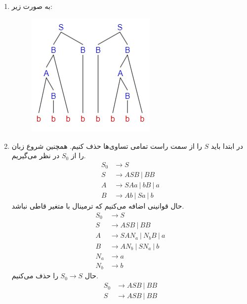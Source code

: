 \subsection{}
\begin{enumerate}
    \item به صورت زیر:
    \begin{figure}[H]
        \centering
        \includegraphics[scale=0.5]{pics/1-3-1.png}
    \end{figure}
    \item در ابتدا باید $S$ را از سمت راست تمامی تساوی‌ها حذف کنیم. همچنین شروع
    زبان را از
    $S_0$
    در نظر می‌گیریم.
    \begin{align*}
        S_0 &\rightarrow S\\
        S &\rightarrow ASB ~|~ BB\\
        A &\rightarrow SAa ~|~ bB ~|~ a\\
        B &\rightarrow Ab ~|~ Sa ~|~ b
    \end{align*}
    حال قوانینی اضافه می‌‌کنیم که ترمینال با متغیر قاطی نباشد.
    \begin{align*}
        S_0 &\rightarrow S\\
        S &\rightarrow ASB ~|~ BB\\
        A &\rightarrow SAN_a ~|~ N_bB ~|~ a\\
        B &\rightarrow AN_b ~|~ SN_a ~|~ b\\
        N_a &\rightarrow a\\
        N_b &\rightarrow b
    \end{align*}
    حال
    $S_0 \rightarrow S$
    را حذف می‌کنیم.
    \begin{align*}
        S_0 &\rightarrow ASB ~|~ BB\\
        S &\rightarrow ASB ~|~ BB\\

\end{align*}
\end{enumerate}
